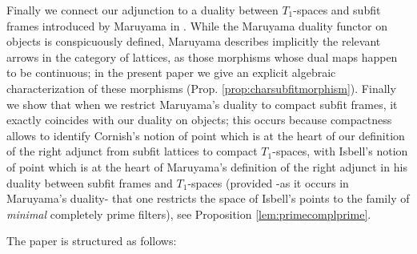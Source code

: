 \documentclass{article}
\theoremstyle{plain}
\theoremstyle{definition}
\theoremstyle{remark}
\newcommand{\0}{\mathbbm 0}
\newcommand{\1}{\mathbbm 1}
\newcommand{\2}{\mathbbm 2}
\begin{document}
Finally we connect our adjunction to a duality between $T_1$-spaces and subfit frames 
introduced by Maruyama in \cite{maruyama}. While the Maruyama duality functor on objects is conspicuously defined, Maruyama describes implicitly the relevant arrows in the category of lattices, as those morphisms whose dual maps happen to be continuous; in the present paper we give an explicit algebraic characterization of these morphisms (Prop. \ref{prop:charsubfitmorphism}).
Finally we show that when we restrict Maruyama's duality to compact subfit frames, it exactly coincides with our duality on objects; this occurs because compactness allows to identify Cornish's notion of point which is at the heart of our definition of the right adjunct from subfit lattices to compact $T_1$-spaces, with Isbell's notion of point which is at the heart of Maruyama's definition of the right adjunct in his duality between subfit frames and $T_1$-spaces (provided -as it occurs in Maruyama's duality- that one restricts the space of Isbell's points to the family of \emph{minimal} completely prime filters), see Proposition \ref{lem:primecomplprime}.
%

The paper is structured as follows:
\end{document}
